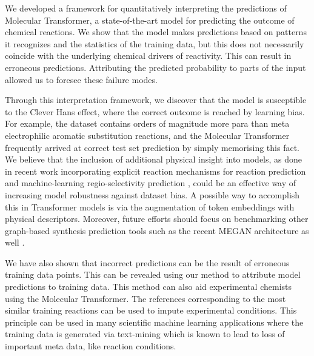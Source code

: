 
We developed a framework for quantitatively interpreting the predictions of Molecular Transformer, a state-of-the-art model for predicting the outcome of chemical reactions. We show that the model makes predictions based on patterns it recognizes and the statistics of the training data, but this does not necessarily coincide with the underlying chemical drivers of reactivity. This can result in erroneous predictions. Attributing the predicted probability to parts of the input allowed us to foresee these failure modes. 

Through this interpretation framework, we discover that the model is susceptible to the Clever Hans effect, where the correct outcome is reached by learning bias. For example, the dataset contains orders of magnitude more para than meta electrophilic aromatic substitution reactions, and the Molecular Transformer frequently arrived at correct test set prediction by simply memorising this fact. We believe that the inclusion of additional physical insight into models, as done in recent work incorporating explicit reaction mechanisms for reaction prediction \cite{bradshaw2019generative} and machine-learning regio-selectivity prediction \cite{guan_coley_robust}, could be an effective way of increasing model robustness against dataset bias. A possible way to accomplish this in Transformer models is via the augmentation of token embeddings with physical descriptors. Moreover, future efforts should focus on benchmarking other graph-based synthesis prediction tools such as the recent MEGAN architecture as well \cite{sacha2020molecule}.

We have also shown that incorrect predictions can be the result of erroneous training data points. This can be revealed using our method to attribute model predictions to training data. This method can also aid experimental chemists using the Molecular Transformer. The references corresponding to the most similar training reactions can be used to impute experimental conditions. This principle can be used in many scientific machine learning applications where the training data is generated via text-mining which is known to lead to loss of important meta data, like reaction conditions. 

